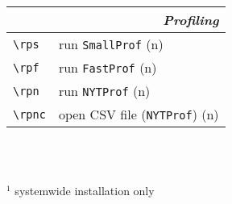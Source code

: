 \documentclass[oneside,10pt,landscape,DIV17]{scrartcl}
\begin{document}
\begin{multicols}{3}
\begin{center}
\begin{tabular}[]{|p{11mm}|p{58mm}|}
\hline
\multicolumn{2}{|r|}{\textsl{\textbf{P}rofiling}}                 \\[1.0ex]
\hline \verb'\rps'    & run \verb'SmallProf'            \hfill (n)\\
\hline \verb'\rpf'    & run \verb'FastProf'             \hfill (n)\\
\hline \verb'\rpn'    & run \verb'NYTProf'              \hfill (n)\\
\hline \verb'\rpnc'   & open CSV file (\verb'NYTProf')  \hfill (n)\\
\hline
\end{tabular}\\
%
\begin{minipage}[b]{75mm}%
\scriptsize{%
\vspace{10mm}
\hrulefill\\
$^1$ {systemwide installation only}\\
}%
\end{minipage}\\
%
\end{center}%
\end{multicols}%
%
\newpage
%
%
\end{document}
